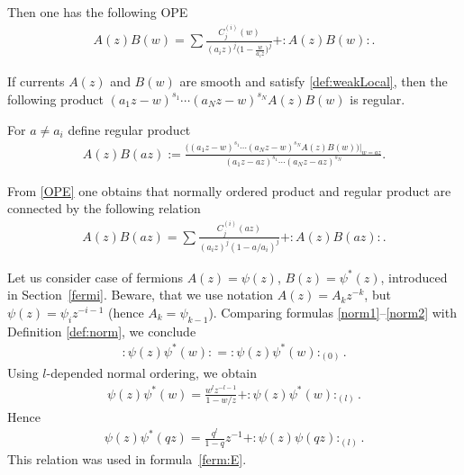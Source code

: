 Then one has the following OPE
\begin{gather}
A(z) B(w) = \sum \frac{C_{j}^{(i)} \! (w)}{(a_i z)^j \big(1-\frac{w}{a_i z} \big)^{j}}+: \! A(z) B(w) \! :. \label{OPE}
\end{gather}
\begin{Proposition}
If currents $A(z)$ and $B(w)$ are smooth and satisfy \eqref{def:weakLocal}, then the following product \mbox{$(a_1 z - w)^{s_1} \cdots (a_N z - w)^{s_N} A(z) B(w)$} is regular.
\end{Proposition}
\begin{Definition} \label{def: the product}
For $a \neq a_i$ define regular product
\begin{gather*}
A(z) B(az) := \frac{ \big( (a_1 z - w)^{s_1} \cdots (a_N z - w)^{s_N} A(z) B(w) \big) \big|_{w=az}}{(a_1 z - az)^{s_1} \cdots (a_N z - az)^{s_N}}.
\end{gather*}
\end{Definition}

From \eqref{OPE} one obtains that normally ordered product and regular product are connected by the following relation
\begin{gather*}
A(z) B(az) = \sum \frac{C_{j}^{(i)} \! (az)}{(a_i z)^j (1-a/a_i)^{j}}+: \! A(z) B(az) \! :.
\end{gather*}

\begin{Example}
Let us consider case of fermions $A(z) = \psi(z)$, $B(z) = \psi^*(z)$, introduced in Section~\ref{fermi}. Beware, that we use notation $A(z)=A_k z^{-k}$, but $\psi(z) = \psi_i z^{-i-1}$ (hence \mbox{$A_k = \psi_{k-1}$}). Comparing formulas \eqref{norm1}--\eqref{norm2} with Definition \ref{def:norm}, we conclude
\begin{gather*}
{: \! \psi(z) \psi^* (w) \! :} = : \psi(z) \psi^*(w):_{(0)}.
\end{gather*}
Using $l$-depended normal ordering, we obtain
\begin{gather} \label{eq: regul prod psipsi}
\psi(z) \psi^* (w) = \frac{w^l z^{-l-1}}{1-w/z} + : \! \psi (z) \psi^* (w) \! :_{(l)}.
\end{gather}
Hence
\begin{gather*}
\psi(z) \psi^* (q z) = \frac{q^l}{1-q} z^{-1} + : \! \psi (z) \psi(qz) \! :_{(l)}.
\end{gather*}
This relation was used in formula~\eqref{ferm:E}.
\end{Example}
